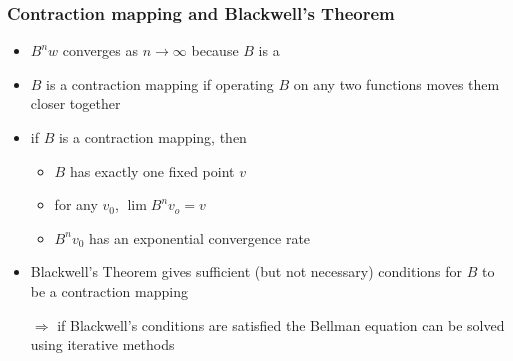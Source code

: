 \documentclass[compress,aspectratio=169]{beamer}
\begin{document}
\begin{frame}
\frametitle{Contraction mapping and Blackwell's Theorem}
\begin{itemize}
\item $B^nw$ converges as $n\rightarrow \infty$ because $B$ is a {\color{red!70!white}{contraction mapping}}
\item $B$ is a contraction mapping if operating $B$ on any two functions moves them closer together
\vspace{3 mm}
\item if $B$ is a contraction mapping, then 
	\begin{itemize}
	\item $B$ has exactly one fixed point $v$
	\item for any $v_0$, $\lim B^nv_o=v$
	\item $B^nv_0$ has an exponential convergence rate 
	\end{itemize}
\vspace{3 mm}
\item Blackwell's Theorem gives sufficient (but not necessary) conditions for $B$ to be a contraction mapping
\vspace{3 mm}
\item[$\Rightarrow$] if Blackwell's conditions are satisfied the Bellman equation can be solved using iterative methods
\end{itemize}
\end{frame}
\end{document}
